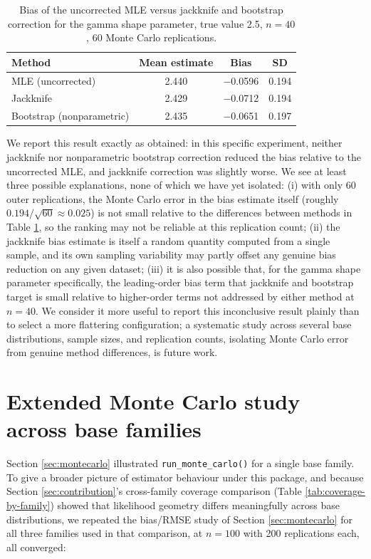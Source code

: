 \begin{table}[htbp]
\centering
\begin{tabular}{@{}lccc@{}}
\toprule
Method & Mean estimate & Bias & SD \\
\midrule
MLE (uncorrected) & 2.440 & $-$0.0596 & 0.194 \\
Jackknife & 2.429 & $-$0.0712 & 0.194 \\
Bootstrap (nonparametric) & 2.435 & $-$0.0651 & 0.197 \\
\bottomrule
\end{tabular}
\caption{Bias of the uncorrected MLE versus jackknife and bootstrap
correction for the gamma shape parameter, true value 2.5, $n=40$, 60
Monte Carlo replications.}
\label{tab:bias-correction}
\end{table}

We report this result exactly as obtained: in this specific experiment,
neither jackknife nor nonparametric bootstrap correction reduced the
bias relative to the uncorrected MLE, and jackknife correction was
slightly worse. We see at least three possible explanations, none of
which we have yet isolated: (i) with only 60 outer replications, the
Monte Carlo error in the bias estimate itself (roughly $0.194/\sqrt{60}
\approx 0.025$) is not small relative to the differences between methods
in Table \ref{tab:bias-correction}, so the ranking may not be reliable
at this replication count; (ii) the jackknife bias estimate is itself a
random quantity computed from a single sample, and its own sampling
variability may partly offset any genuine bias reduction on any given
dataset; (iii) it is also possible that, for the gamma shape parameter
specifically, the leading-order bias term that jackknife and bootstrap
target is small relative to higher-order terms not addressed by either
method at $n=40$. We consider it more useful to report this
inconclusive result plainly than to select a more flattering
configuration; a systematic study across several base distributions,
sample sizes, and replication counts, isolating Monte Carlo error from
genuine method differences, is future work.

\section{Extended Monte Carlo study across base families}
\label{sec:extendedmc}

Section \ref{sec:montecarlo} illustrated \texttt{run\_monte\_carlo()} for
a single base family. To give a broader picture of estimator behaviour
under this package, and because Section \ref{sec:contribution}'s
cross-family coverage comparison (Table \ref{tab:coverage-by-family})
showed that likelihood geometry differs meaningfully across base
distributions, we repeated the bias/RMSE study of Section
\ref{sec:montecarlo} for all three families used in that comparison, at
$n=100$ with 200 replications each, all converged:

